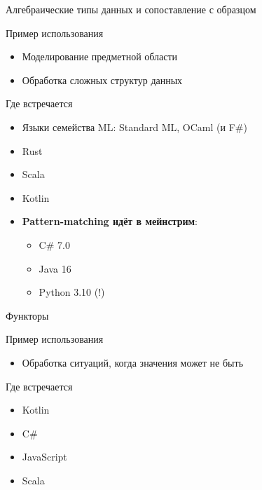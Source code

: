\documentclass{beamer}
\begin{document}
\begin{frame}{Алгебраические типы данных и сопоставление с образцом}
    \begin{block}{Пример использования}
        \begin{itemize}
            \item Моделирование предметной области
            \item Обработка сложных структур данных
        \end{itemize}
    \end{block}
    \begin{block}{Где встречается}
        \begin{itemize}
            \item Языки семейства ML: Standard ML, OCaml (и F\#)
            \item Rust
            \item Scala
            \item Kotlin
            \item \textbf{Pattern-matching идёт в мейнстрим}:
            \begin{itemize}
                \item C\# 7.0
                \item Java 16
                \item Python 3.10 (!)
            \end{itemize}
        \end{itemize}
    \end{block}
\end{frame}
\begin{frame}{Функторы}
    \begin{block}{Пример использования}
        \begin{itemize}
            \item Обработка ситуаций, когда значения может не быть
        \end{itemize}
    \end{block}
    \begin{block}{Где встречается}
        \begin{itemize}
            \item Kotlin
            \item C\#
            \item JavaScript
            \item Scala
        \end{itemize}
    \end{block}
\end{frame}
\end{document}
